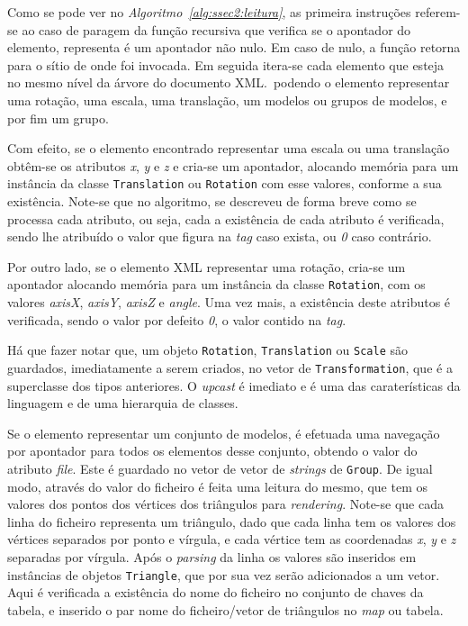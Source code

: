 Como se pode ver no \emph{Algoritmo~\ref{alg:ssec2:leitura}}, as primeira
instruções referem-se ao caso de paragem da função recursiva que verifica se
o apontador do elemento, representa é um apontador não nulo. Em caso de nulo,
a função retorna para o sítio de onde foi invocada. 
Em seguida itera-se cada elemento que esteja no mesmo nível da árvore do
documento XML.\ podendo o elemento representar uma rotação, uma escala, uma
translação, um modelos ou grupos de modelos, e por fim um grupo.

Com efeito, se o elemento encontrado representar uma escala ou uma
translação obtêm-se os atributos \emph{x}, \emph{y} e \emph{z} e cria-se um
apontador, alocando memória para um instância da classe \texttt{Translation} ou
\texttt{Rotation} com esse valores, conforme a sua existência. Note-se que no
algoritmo, se descreveu de forma breve como se processa cada atributo, ou seja,
cada a existência de cada atributo é verificada, sendo lhe atribuído o valor que
figura na \emph{tag} caso exista, ou \emph{0} caso contrário. 

Por outro lado, se o elemento XML representar uma rotação, cria-se um apontador
alocando memória para um instância da classe \texttt{Rotation}, com os valores
\emph{axisX}, \emph{axisY}, \emph{axisZ} e \emph{angle}. Uma vez mais,
a existência deste atributos é verificada, sendo o valor por defeito \emph{0},
o valor contido na \emph{tag}. 

Há que fazer notar que, um objeto \texttt{Rotation}, \texttt{Translation} ou
\texttt{Scale} são guardados, imediatamente a serem criados, no vetor de
\texttt{Transformation}, que é a superclasse dos tipos anteriores.
O \emph{upcast} é imediato e é uma das caraterísticas da linguagem e de uma
hierarquia de classes. 

Se o elemento representar um conjunto de modelos, é efetuada uma navegação por
apontador para todos os elementos desse conjunto, obtendo o valor do atributo
\emph{file}. Este é guardado no vetor de vetor de \emph{strings} de
\texttt{Group}. De igual modo, através do valor do ficheiro é feita uma leitura
do mesmo, que tem os valores dos pontos dos vértices dos triângulos para
\emph{rendering}. Note-se que cada linha do ficheiro representa um triângulo,
dado que cada linha tem os valores dos vértices separados por ponto e vírgula,
e cada vértice tem as coordenadas \emph{x}, \emph{y} e \emph{z} separadas por
vírgula. Após o \emph{parsing} da linha os valores são inseridos em instâncias
de objetos \texttt{Triangle}, que por sua vez serão adicionados a um vetor.
Aqui é verificada a existência do nome do ficheiro no conjunto de chaves da
tabela, e inserido o par nome do ficheiro/vetor de triângulos no \emph{map} ou
tabela.      

